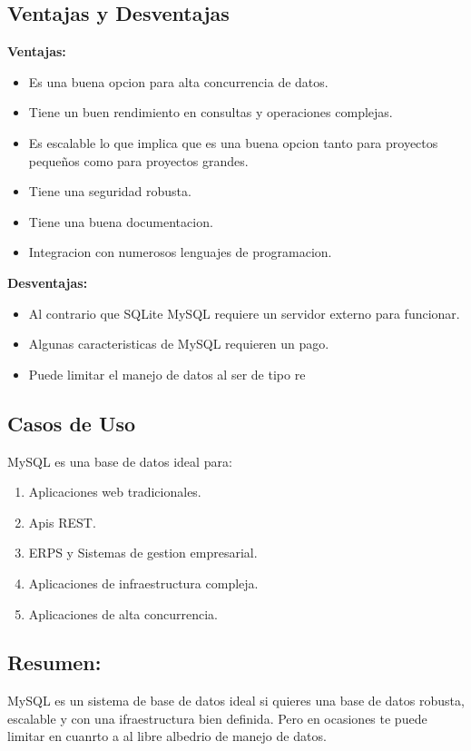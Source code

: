 \documentclass[12pt]{article}
\begin{document}
\vspace{1cm}
\subsection{Ventajas y Desventajas}
\textbf{Ventajas:}
\begin{itemize}
    \item Es una buena opcion para alta concurrencia de datos.
    \item Tiene un buen rendimiento en consultas y operaciones complejas.
    \item Es escalable lo que implica que es una buena opcion tanto para proyectos pequeños como para proyectos grandes.
    \item Tiene una seguridad robusta.
    \item Tiene una buena documentacion.
    \item Integracion con numerosos lenguajes de programacion.
\end{itemize}
\vspace{0.5cm}

\textbf{Desventajas:}
\begin{itemize}
    \item Al contrario que SQLite MySQL requiere un servidor externo para funcionar.
    \item Algunas caracteristicas de MySQL requieren un pago.
    \item Puede limitar el manejo de datos al ser de tipo re
\end{itemize}
\vspace{1cm}
\subsection{Casos de Uso}
MySQL es una base de datos ideal para:
\begin{enumerate}
    \item Aplicaciones web tradicionales.
    \item Apis REST.
    \item ERPS y Sistemas de gestion empresarial.
    \item Aplicaciones de infraestructura compleja.
    \item Aplicaciones de alta concurrencia.
\end{enumerate}

\subsection{Resumen:}
MySQL es un sistema de base de datos ideal si quieres una base de datos robusta, escalable y con una ifraestructura bien definida. Pero en ocasiones te puede limitar en cuanrto a al libre albedrio de manejo de datos.
\end{document}
